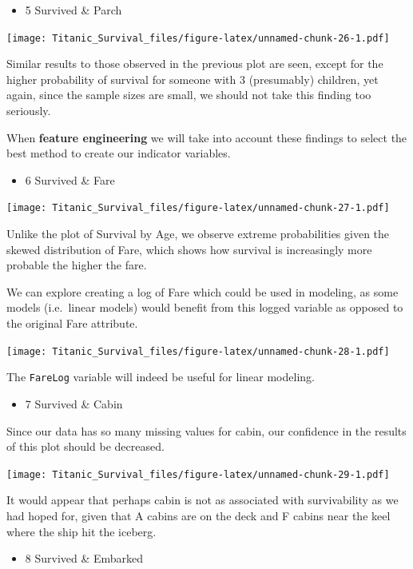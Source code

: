 \documentclass[]{article}
\providecommand{\tightlist}{%
  \setlength{\itemsep}{0pt}\setlength{\parskip}{0pt}}
\begin{document}
\begin{itemize}
\tightlist
\item
  5 Survived \& Parch
\end{itemize}

\texttt{[image: Titanic\_Survival\_files/figure-latex/unnamed-chunk-26-1.pdf]}

Similar results to those observed in the previous plot are seen, except
for the higher probability of survival for someone with 3 (presumably)
children, yet again, since the sample sizes are small, we should not
take this finding too seriously.

When \textbf{feature engineering} we will take into account these
findings to select the best method to create our indicator variables.

\begin{itemize}
\tightlist
\item
  6 Survived \& Fare
\end{itemize}

\texttt{[image: Titanic\_Survival\_files/figure-latex/unnamed-chunk-27-1.pdf]}

Unlike the plot of Survival by Age, we observe extreme probabilities
given the skewed distribution of Fare, which shows how survival is
increasingly more probable the higher the fare.

We can explore creating a log of Fare which could be used in modeling,
as some models (i.e.~linear models) would benefit from this logged
variable as opposed to the original Fare attribute.

\texttt{[image: Titanic\_Survival\_files/figure-latex/unnamed-chunk-28-1.pdf]}

The \texttt{FareLog} variable will indeed be useful for linear modeling.

\begin{itemize}
\tightlist
\item
  7 Survived \& Cabin
\end{itemize}

Since our data has so many missing values for cabin, our confidence in
the results of this plot should be decreased.

\texttt{[image: Titanic\_Survival\_files/figure-latex/unnamed-chunk-29-1.pdf]}

It would appear that perhaps cabin is not as associated with
survivability as we had hoped for, given that A cabins are on the deck
and F cabins near the keel where the ship hit the iceberg.

\begin{itemize}
\tightlist
\item
  8 Survived \& Embarked
\end{itemize}
\end{document}
